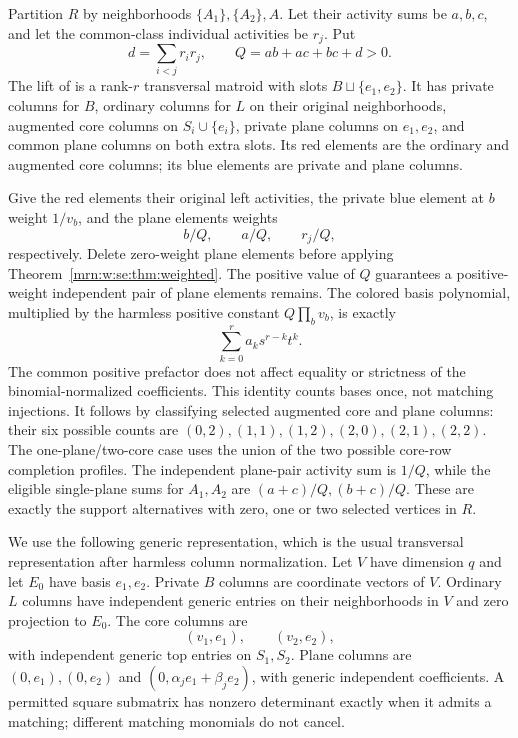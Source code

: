 \documentclass[11pt,a4paper]{article}
\theoremstyle{remark}\newtheorem{remark}[theorem]{Remark}
\begin{document}
Partition $R$ by neighborhoods $\{A_1\},\{A_2\},A$. Let their activity sums be $a,b,c$, and let the common-class individual activities be $r_j$. Put
\[
 d=\sum_{i<j}r_ir_j,\qquad Q=ab+ac+bc+d>0.
\]
The lift of \cite{b:m74} is a rank-$r$ transversal matroid with slots $B\sqcup\{e_1,e_2\}$. It has private columns for $B$, ordinary columns for $L$ on their original neighborhoods, augmented core columns on $S_i\cup\{e_i\}$, private plane columns on $e_1,e_2$, and common plane columns on both extra slots. Its red elements are the ordinary and augmented core columns; its blue elements are private and plane columns.

Give the red elements their original left activities, the private blue element at $b$ weight $1/v_b$, and the plane elements weights
\[
 b/Q,\qquad a/Q,\qquad r_j/Q,
\]
respectively. Delete zero-weight plane elements before applying Theorem~\ref{mrn:w:se:thm:weighted}. The positive value of $Q$ guarantees a positive-weight independent pair of plane elements remains. The colored basis polynomial, multiplied by the harmless positive constant $Q\prod_bv_b$, is exactly
\begin{equation}\label{mrn:w:se:eq:identity}
 \sum_{k=0}^{r}a_k s^{r-k}t^k.
\end{equation}
The common positive prefactor does not affect equality or strictness of the binomial-normalized coefficients. This identity counts bases once, not matching injections. It follows by classifying selected augmented core and plane columns: their six possible counts are $(0,2),(1,1),(1,2),(2,0),(2,1),(2,2)$. The one-plane/two-core case uses the union of the two possible core-row completion profiles. The independent plane-pair activity sum is $1/Q$, while the eligible single-plane sums for $A_1,A_2$ are $(a+c)/Q,(b+c)/Q$. These are exactly the support alternatives with zero, one or two selected vertices in $R$.

We use the following generic representation, which is the usual transversal representation after harmless column normalization. Let $V$ have dimension $q$ and let $E_0$ have basis $e_1,e_2$. Private $B$ columns are coordinate vectors of $V$. Ordinary $L$ columns have independent generic entries on their neighborhoods in $V$ and zero projection to $E_0$. The core columns are
\[
 (v_1,e_1),\qquad(v_2,e_2),
\]
with independent generic top entries on $S_1,S_2$. Plane columns are $(0,e_1),(0,e_2)$ and $(0,\alpha_j e_1+\beta_j e_2)$, with generic independent coefficients. A permitted square submatrix has nonzero determinant exactly when it admits a matching; different matching monomials do not cancel.
\end{document}
